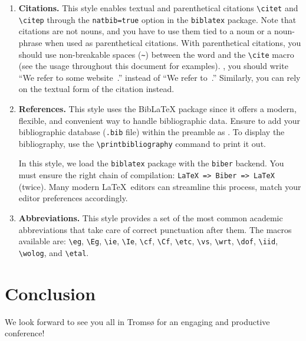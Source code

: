 \documentclass[fullpaper]{nldl}
\begin{document}
\begin{enumerate}[leftmargin=*]
\item \textbf{Citations.}
This style enables textual and parenthetical citations \verb|\citet| and \verb|\citep| through the \verb|natbib=true| option in the \verb|biblatex| package.
Note that citations are not nouns, and you have to use them tied to a noun or a noun-phrase when used as parenthetical citations.
With parenthetical citations, you should use non-breakable spaces (\verb|~|) between the word and the \verb|\cite| macro (see the usage throughout this document for examples).
\Eg, you should write ``We refer to some website~\citep{tromso}.''  instead of ``We refer to~\citep{tromso}.''
Similarly, you can rely on the textual form of the citation instead.

\item \textbf{References.}
This style uses the BibLaTeX package since it offers a modern, flexible, and convenient way to handle bibliographic data.
Ensure to add your bibliographic database (\verb|.bib| file) within the preamble as \verb||.
To display the bibliography, use the \verb|\printbibliography| command to print it out.

In this style, we load the \verb|biblatex| package with the \verb|biber| backend.
You must ensure the right chain of compilation: \verb|LaTeX => Biber => LaTeX| (twice).
Many modern \LaTeX\ editors can streamline this process, match your editor preferences accordingly.

\item \textbf{Abbreviations.}
This style provides a set of the most common academic abbreviations that take care of correct punctuation after them.
The macros available are: \verb|\eg|, \verb|\Eg|, \verb|\ie|, \verb|\Ie|, \verb|\cf|, \verb|\Cf|, \verb|\etc|, \verb|\vs|, \verb|\wrt|, \verb|\dof|, \verb|\iid|, \verb|\wolog|, and \verb|\etal|.

\end{enumerate}

\section{Conclusion}
We look forward to see you all in Troms{\o} for an engaging and productive conference!


\printbibliography
\end{document}
